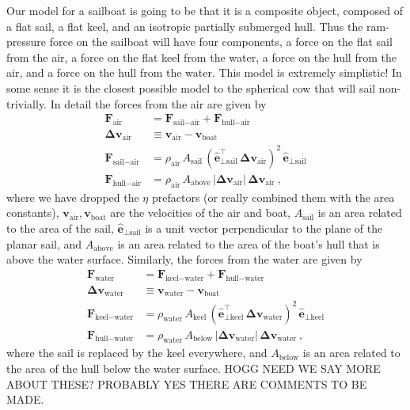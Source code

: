 \documentclass[letterpaper]{article}
\renewcommand{\vec}[1]{\boldsymbol{#1}}
\newcommand{\uvec}{\vec{\hat{e}}}
\newcommand{\air}{\text{air}}
\newcommand{\water}{\text{water}}
\newcommand{\boat}{\text{boat}}
\newcommand{\sail}{\text{sail}}
\newcommand{\keel}{\text{keel}}
\newcommand{\hull}{\text{hull}}
\renewcommand{\above}{\text{above}}
\newcommand{\below}{\text{below}}
\newcommand{\vair}{\vec{v}_\air}
\newcommand{\vwater}{\vec{v}_\water}
\newcommand{\vboat}{\vec{v}_\boat}
\begin{document}
Our model for a sailboat is going to be that it is a composite object, composed of a flat sail, a flat keel, and an isotropic partially submerged hull.
Thus the ram-pressure force on the sailboat will have four components, a force on the flat sail from the air, a force on the flat keel from the water, a force on the hull from the air, and a force on the hull from the water.
This model is extremely simplistic!
In some sense it is the closest possible model to the spherical cow that will sail non-trivially.
In detail the forces from the air are given by
\begin{align}\label{eq:startmodel}
  \vec{F}_\air &= \vec{F}_{\sail-\air} + \vec{F}_{\hull-\air}
  \\
  \vec{\Delta v}_\air &\equiv \vair - \vboat \label{eq:deltav}
  \\
  \vec{F}_{\sail-\air} & = \rho_\air\,A_\sail\,(\uvec_{\perp\sail}^\top\,\vec{\Delta v}_\air)^2\,\uvec_{\perp\sail} \label{eq:Fsailair}
  \\
  \vec{F}_{\hull-\air} & = \rho_\air\,A_{\above}\,|\vec{\Delta v}_\air|\,\vec{\Delta v}_\air \label{eq:Fhullair} ~,
\end{align}
where we have dropped the $\eta$ prefactors (or really combined them with the area constants), $\vair,\vboat$ are the velocities of the air and boat, $A_\sail$ is an area related to the area of the sail, $\uvec_{\perp\sail}$ is a unit vector perpendicular to the plane of the planar sail, and $A_{\above}$ is an area related to the area of the boat's hull that is above the water surface.
Similarly, the forces from the water are given by
\begin{align}
  \vec{F}_\water &= \vec{F}_{\keel-\water} + \vec{F}_{\hull-\water}
  \\
  \vec{\Delta v}_\water &\equiv \vwater - \vboat
  \\
  \vec{F}_{\keel-\water} & = \rho_\water\,A_\keel\,(\uvec_{\perp\keel}^\top\,\vec{\Delta v}_\water)^2\,\uvec_{\perp\keel}
  \\
  \vec{F}_{\hull-\water} & = \rho_\water\,A_{\below}\,|\vec{\Delta v}_\water|\,\vec{\Delta v}_\water ~,\label{eq:endmodel}
\end{align}
where the sail is replaced by the keel everywhere, and $A_{\below}$ is an area related to the area of the hull below the water surface.
HOGG NEED WE SAY MORE ABOUT THESE? PROBABLY YES THERE ARE COMMENTS TO BE MADE.
\end{document}
